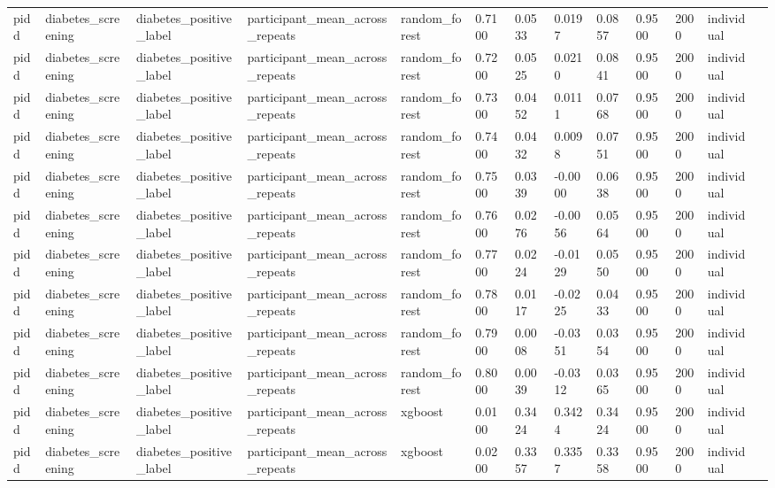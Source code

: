 \begin{tabular}{lllllllllllll}
pidd & diabetes\_screening & diabetes\_positive\_label & participant\_mean\_across\_repeats & random\_forest & 0.7100 & 0.0533 & 0.0197 & 0.0857 & 0.9500 & 2000 & individual &  \\
pidd & diabetes\_screening & diabetes\_positive\_label & participant\_mean\_across\_repeats & random\_forest & 0.7200 & 0.0525 & 0.0210 & 0.0841 & 0.9500 & 2000 & individual &  \\
pidd & diabetes\_screening & diabetes\_positive\_label & participant\_mean\_across\_repeats & random\_forest & 0.7300 & 0.0452 & 0.0111 & 0.0768 & 0.9500 & 2000 & individual &  \\
pidd & diabetes\_screening & diabetes\_positive\_label & participant\_mean\_across\_repeats & random\_forest & 0.7400 & 0.0432 & 0.0098 & 0.0751 & 0.9500 & 2000 & individual &  \\
pidd & diabetes\_screening & diabetes\_positive\_label & participant\_mean\_across\_repeats & random\_forest & 0.7500 & 0.0339 & -0.0000 & 0.0638 & 0.9500 & 2000 & individual &  \\
pidd & diabetes\_screening & diabetes\_positive\_label & participant\_mean\_across\_repeats & random\_forest & 0.7600 & 0.0276 & -0.0056 & 0.0564 & 0.9500 & 2000 & individual &  \\
pidd & diabetes\_screening & diabetes\_positive\_label & participant\_mean\_across\_repeats & random\_forest & 0.7700 & 0.0224 & -0.0129 & 0.0550 & 0.9500 & 2000 & individual &  \\
pidd & diabetes\_screening & diabetes\_positive\_label & participant\_mean\_across\_repeats & random\_forest & 0.7800 & 0.0117 & -0.0225 & 0.0433 & 0.9500 & 2000 & individual &  \\
pidd & diabetes\_screening & diabetes\_positive\_label & participant\_mean\_across\_repeats & random\_forest & 0.7900 & 0.0008 & -0.0351 & 0.0354 & 0.9500 & 2000 & individual &  \\
pidd & diabetes\_screening & diabetes\_positive\_label & participant\_mean\_across\_repeats & random\_forest & 0.8000 & 0.0039 & -0.0312 & 0.0365 & 0.9500 & 2000 & individual &  \\
pidd & diabetes\_screening & diabetes\_positive\_label & participant\_mean\_across\_repeats & xgboost & 0.0100 & 0.3424 & 0.3424 & 0.3424 & 0.9500 & 2000 & individual &  \\
pidd & diabetes\_screening & diabetes\_positive\_label & participant\_mean\_across\_repeats & xgboost & 0.0200 & 0.3357 & 0.3357 & 0.3358 & 0.9500 & 2000 & individual &  \\

\end{tabular}
